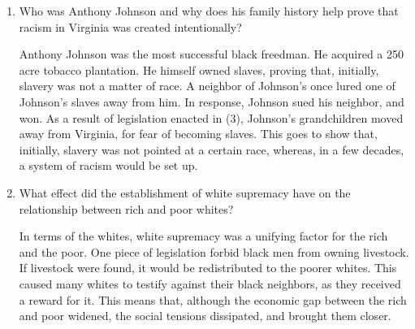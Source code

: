 \documentclass[12pt]{article}
\begin{document}
\begin{enumerate}
  \item Who was Anthony Johnson and why does his family history help prove that racism in Virginia was created intentionally?

    \begin{justify} Anthony Johnson was the most successful black freedman. He acquired a 250 acre tobacco plantation. He himself owned slaves, proving that, initially, slavery was not a matter of race. A neighbor of Johnson's once lured one of Johnson's slaves away from him. In response, Johnson sued his neighbor, and won. As a result of legislation enacted in (3), Johnson's grandchildren moved away from Virginia, for fear of becoming slaves. This goes to show that, initially, slavery was not pointed at a certain race, whereas, in a few decades, a system of racism would be set up. \end{justify}

  \item What effect did the establishment of white supremacy have on the relationship between rich and poor whites?

    \begin{justify} In terms of the whites, white supremacy was a unifying factor for the rich and the poor. One piece of legislation forbid black men from owning livestock. If livestock were found, it would be redistributed to the poorer whites. This caused many whites to testify against their black neighbors, as they received a reward for it. This means that, although the economic gap between the rich and poor widened, the social tensions dissipated, and brought them closer.   \end{justify}

\end{enumerate}
\end{document}
